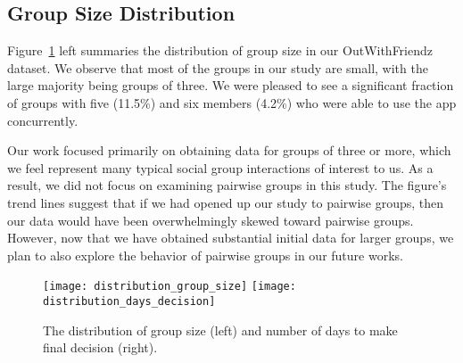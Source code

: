 \subsection{Group Size Distribution}
Figure~\ref{fig:groupsize} left summaries the distribution of group size in our OutWithFriendz dataset.   We observe that most of the groups in our study are small, with the large majority being groups of three.  We were pleased to see a significant fraction of groups with five (11.5\%) and six members (4.2\%) who were able to use the app concurrently.
\iffalse
The size of most groups participating in our study is not large, which commonly represent the common
case of user hanging out with their close friends or family members for meals. In addition, we also 
have some medium groups. For example, some users on campus will create an event to decide when
to play basketball in Recreation Center. Please note that we don't count any events with two users in our study
as the group size is too small to use our voting mechanism. 
\fi
Our work focused primarily on obtaining data for groups of three or more, which we feel represent many typical social group interactions of interest to us.  As a result, we did not focus on examining pairwise groups in this study.  The figure's trend lines suggest that if we had opened up our study to pairwise groups, then our data would have been overwhelmingly skewed toward pairwise groups.  However, now that we have obtained substantial initial data for larger groups, we plan to also explore the behavior of pairwise groups in our future works.

\begin{figure}
\centering
\texttt{[image: distribution\_group\_size]}
\texttt{[image: distribution\_days\_decision]}
\caption{The distribution of group size (left) and number of days to make final decision (right).}
\label{fig:groupsize}
\end{figure}

